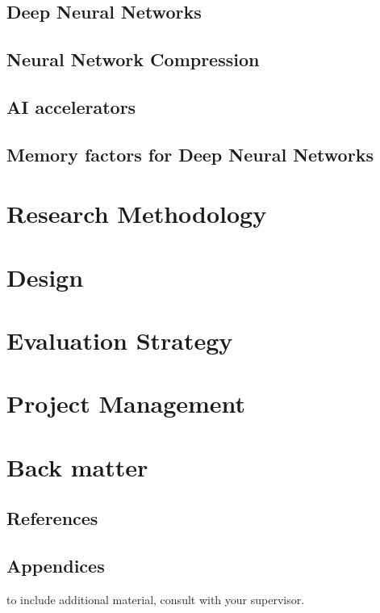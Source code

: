 \documentclass[11pt]{article}
\begin{document}
\subsection{Deep Neural Networks}\label{subsec:deepLearning}


\newpage
\subsection{Neural Network Compression}\label{subsec:compressionTypes}


\newpage
\subsection{AI accelerators}\label{subsec:AIaccelerators}


\subsection{Memory factors for Deep Neural Networks}\label{subsec:hardwareArch}


\pagebreak
\section{Research Methodology}


\pagebreak
\section{Design}


\pagebreak
\section{Evaluation Strategy}


\pagebreak
\section{Project Management}


\pagebreak
\appendix
\section{Back matter}
\subsection{References}
\printbibliography

\subsection{Appendices}
to include additional material, consult with your supervisor.

\printnoidxglossary[type=acronym]
\printacronyms
\end{document}
